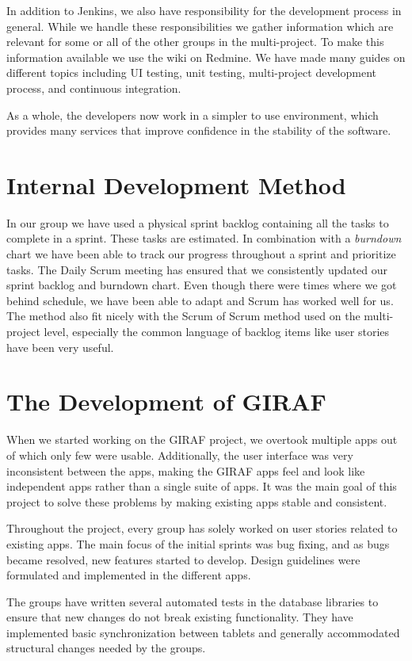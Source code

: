 In addition to Jenkins, we also have responsibility for the development process in general. While we handle these responsibilities we gather information which are relevant for some or all of the other groups in the multi-project. To make this information available we use the wiki on Redmine. We have made many guides on different topics including UI testing, unit testing, multi-project development process, and continuous integration.

As a whole, the developers now work in a simpler to use environment, which provides many services that improve confidence in the stability of the software.

\section{Internal Development Method}\label{conc:internalprocess}
In our group we have used a physical sprint backlog containing all the tasks to complete in a sprint. These tasks are estimated. In combination with a \emph{burndown} chart we have been able to track our progress throughout a sprint and prioritize tasks. The Daily Scrum meeting has ensured that we consistently updated our sprint backlog and burndown chart. Even though there were times where we got behind schedule, we have been able to adapt and Scrum has worked well for us. The method also fit nicely with the Scrum of Scrum method used on the multi-project level, especially the common language of backlog items like user stories have been very useful.

\section{The Development of GIRAF}\label{conc:multi_project_eval}
When we started working on the GIRAF project, we overtook multiple apps out of which only few were usable. Additionally, the user interface was very inconsistent between the apps, making the GIRAF apps feel and look like independent apps rather than a single suite of apps. It was the main goal of this project to solve these problems by making existing apps stable and consistent.

Throughout the project, every \gui{} group has solely worked on user stories related to existing apps. The main focus of the initial sprints was bug fixing, and as bugs became resolved, new features started to develop. Design guidelines were formulated and implemented in the different apps.

The \db{} groups have written several automated tests in the database libraries to ensure that new changes do not break existing functionality. They have implemented basic synchronization between tablets and generally accommodated structural changes needed by the \gui{} groups.

